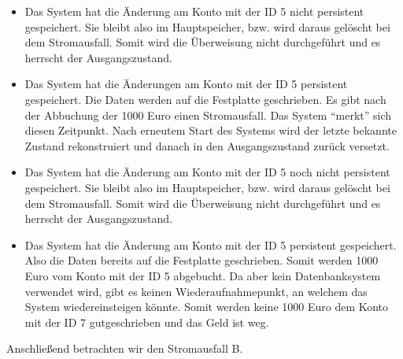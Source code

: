 \documentclass[ngerman]{gdb-aufgabenblatt}
\begin{document}
	\begin{itemize}
		\item Das System hat die Änderung am Konto mit der ID 5 nicht persistent gespeichert. Sie bleibt also im Hauptspeicher, bzw. wird daraus gelöscht bei dem Stromausfall. Somit wird die Überweisung nicht durchgeführt und es herrscht der Ausgangszustand.

		\item Das System hat die Änderungen am Konto mit der ID 5 persistent gespeichert. Die Daten werden auf die Festplatte geschrieben. Es gibt nach der Abbuchung der 1000 Euro einen Stromausfall. Das System "`merkt"' sich diesen Zeitpunkt. Nach erneutem Start des Systems wird der letzte bekannte Zustand rekonstruiert und danach in den Ausgangszustand zurück versetzt.
		
		\item Das System hat die Änderung am Konto mit der ID 5 noch nicht persistent gespeichert. Sie bleibt also im Hauptspeicher, bzw. wird daraus gelöscht bei dem Stromausfall. Somit wird die Überweisung nicht durchgeführt und es herrscht der Ausgangszustand.
		
		\item Das System hat die Änderung am Konto mit der ID 5 persistent gespeichert. Also die Daten bereits auf die Festplatte geschrieben. Somit werden 1000 Euro vom Konto mit der ID 5 abgebucht. Da aber kein Datenbanksystem verwendet wird, gibt es keinen Wiederaufnahmepunkt, an welchem das System wiedereinsteigen könnte. Somit werden keine 1000 Euro dem Konto mit der ID 7 gutgeschrieben und das Geld ist weg.
	\end{itemize}
	
	Anschließend betrachten wir den Stromausfall B.
\end{document}
